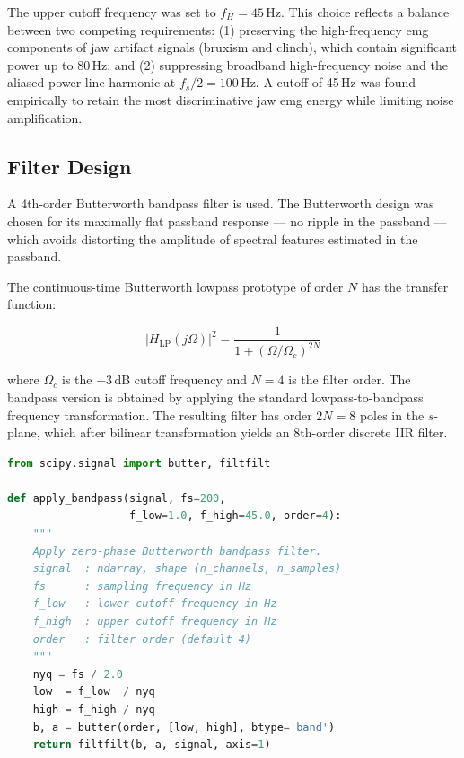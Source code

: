 The upper cutoff frequency was set to $f_H = 45$\,Hz. This
choice reflects a balance between two competing requirements:
(1) preserving the high-frequency \acrshort{emg} components
of jaw artifact signals (bruxism and clinch), which contain
significant power up to 80\,Hz; and (2) suppressing broadband
high-frequency noise and the aliased power-line harmonic at
$f_s/2 = 100$\,Hz. A cutoff of 45\,Hz was found empirically
to retain the most discriminative jaw \acrshort{emg} energy
while limiting noise amplification.

\subsection{Filter Design}

A 4th-order Butterworth bandpass filter is used. The Butterworth
design was chosen for its maximally flat passband response —
no ripple in the passband — which avoids distorting the
amplitude of spectral features estimated in the passband.

The continuous-time Butterworth lowpass prototype of order $N$
has the transfer function:

\begin{equation}
\left|H_{\text{LP}}(j\Omega)\right|^2 =
\frac{1}{1 + \left(\Omega/\Omega_c\right)^{2N}}
\label{eq:butterworth}
\end{equation}

\noindent where $\Omega_c$ is the $-3$\,dB cutoff frequency
and $N = 4$ is the filter order. The bandpass version is
obtained by applying the standard lowpass-to-bandpass
frequency transformation. The resulting filter has order $2N
= 8$ poles in the $s$-plane, which after bilinear
transformation yields an 8th-order discrete IIR filter.

\begin{lstlisting}[language=Python,
    caption={Bandpass filter implementation.},
    label={lst:bandpass}]
from scipy.signal import butter, filtfilt

def apply_bandpass(signal, fs=200,
                   f_low=1.0, f_high=45.0, order=4):
    """
    Apply zero-phase Butterworth bandpass filter.
    signal  : ndarray, shape (n_channels, n_samples)
    fs      : sampling frequency in Hz
    f_low   : lower cutoff frequency in Hz
    f_high  : upper cutoff frequency in Hz
    order   : filter order (default 4)
    """
    nyq = fs / 2.0
    low  = f_low  / nyq
    high = f_high / nyq
    b, a = butter(order, [low, high], btype='band')
    return filtfilt(b, a, signal, axis=1)
\end{lstlisting}

